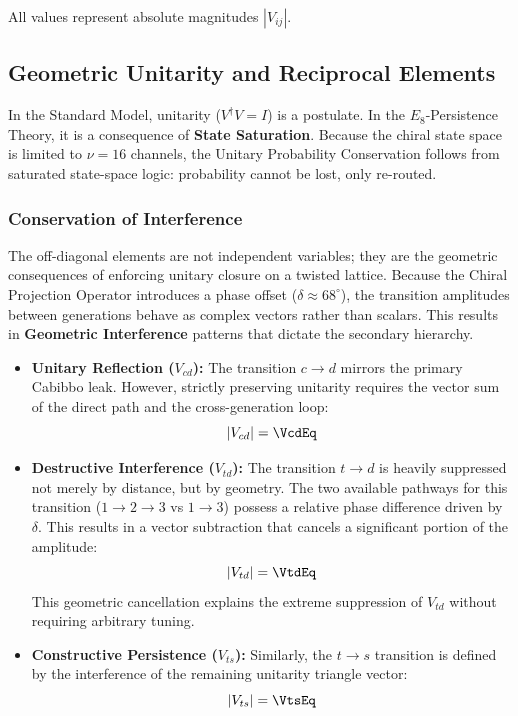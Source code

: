 All values represent absolute magnitudes $|V_{ij}|$.

\subsection{Geometric Unitarity and Reciprocal Elements}

In the Standard Model, unitarity (\(V^{\dag }V=I\)) is a postulate. In the $E_8$-Persistence Theory, it is a consequence of \textbf{State Saturation}. Because the chiral state space is limited to $\nu=16$ channels, the Unitary Probability Conservation follows from saturated state-space logic: probability cannot be lost, only re-routed.

\subsubsection{Conservation of Interference}
The off-diagonal elements are not independent variables; they are the geometric consequences of enforcing unitary closure on a twisted lattice. Because the Chiral Projection Operator introduces a phase offset ($\delta \approx 68^\circ$), the transition amplitudes between generations behave as complex vectors rather than scalars. This results in \textbf{Geometric Interference} patterns that dictate the secondary hierarchy.

\begin{itemize}
    \item \textbf{Unitary Reflection ($V_{cd}$):} The transition $c \to d$ mirrors the primary Cabibbo leak. However, strictly preserving unitarity requires the vector sum of the direct path and the cross-generation loop:
    \begin{equation}
    |V_{cd}| = \VcdEq
    \end{equation}
    
    \item \textbf{Destructive Interference ($V_{td}$):} The transition $t \to d$ is heavily suppressed not merely by distance, but by geometry. The two available pathways for this transition ($1\to 2 \to 3$ vs $1 \to 3$) possess a relative phase difference driven by $\delta$. This results in a vector subtraction that cancels a significant portion of the amplitude:
    \begin{equation}
    |V_{td}| = \VtdEq
    \end{equation}
    This geometric cancellation explains the extreme suppression of $V_{td}$ without requiring arbitrary tuning.
    
    \item \textbf{Constructive Persistence ($V_{ts}$):} Similarly, the $t \to s$ transition is defined by the interference of the remaining unitarity triangle vector:
    \begin{equation}
    |V_{ts}| = \VtsEq
    \end{equation}
\end{itemize}

